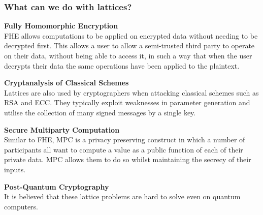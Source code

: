 \documentclass[
aspectratio=169, %
t, %
onlytextwidth, %
10pt, %
]{beamer}
\begin{document}

\begin{frame}
    \frametitle{What can we do with lattices?}

    \begin{minipage}[t][0.45\textheight][t]{0.48\linewidth}
        \textbf{Fully Homomorphic Encryption}\\
        FHE allows computations to be applied on encrypted data without needing to be decrypted first. This allows a user to allow a semi-trusted third party to operate on their data, without being able to access it, in such a way that when the user decrypts their data the same operations have been applied to the plaintext.
    \end{minipage}%
    \hfill
    \begin{minipage}[t][0.45\textheight][t]{0.48\linewidth}
        \textbf{Cryptanalysis of Classical Schemes}\\
        Lattices are also used by cryptographers when attacking classical schemes such as RSA and ECC. They typically exploit weaknesses in parameter generation and utilise the collection of many signed messages by a single key.
    \end{minipage}
    

    \vspace{-1.5em}
    \begin{minipage}[t][0.45\textheight][t]{0.48\linewidth}
        \textbf{Secure Multiparty Computation}\\
        Similar to FHE, MPC is a privacy preserving construct in which a number of participants all want to compute a value as a public function of each of their private data. MPC allows them to do so whilst maintaining the secrecy of their inputs.
    \end{minipage}
    \hfill
    \begin{minipage}[t][0.2\textheight][t]{0.48\linewidth}
        \vspace{3.5em}
        \textbf{Post-Quantum Cryptography}\\
        It is believed that these lattice problems are hard to solve even on quantum computers.
    \end{minipage}
\end{frame}

\end{document}

